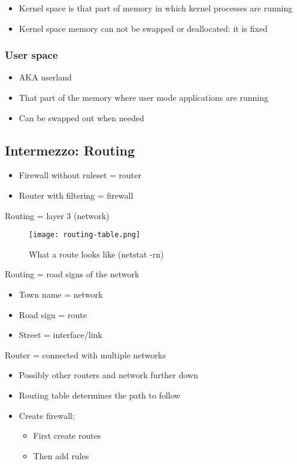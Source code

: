 \documentclass{article}
\begin{document}
\begin{itemize}
    \item Kernel space is that part of memory in which kernel processes are running
    \item Kernel space memory can not be swapped or deallocated: it is fixed
\end{itemize}

\subsubsection{User space}

\begin{itemize}
    \item AKA userland
    \item That part of the memory where user mode applications are running
    \item Can be swapped out when needed
\end{itemize}

\subsection{Intermezzo: Routing}

\begin{itemize}
    \item Firewall without ruleset = router
    \item Router with filtering = firewall
\end{itemize}

Routing = layer 3 (network)

\begin{figure}[H]
    \centering
    \texttt{[image: routing-table.png]}
    \caption{What a route looks like (netstat -rn)}
\end{figure}

Routing = road signs of the network

\begin{itemize}
    \item Town name = network
    \item Road sign = route
    \item Street = interface/link
\end{itemize}

Router = connected with multiple networks

\begin{itemize}
    \item Possibly other routers and network further down
    \item Routing table determines the path to follow
    \item Create firewall:
    \begin{itemize}
        \item First create routes
        \item Then add rules
    \end{itemize}
\end{itemize}
\end{document}
